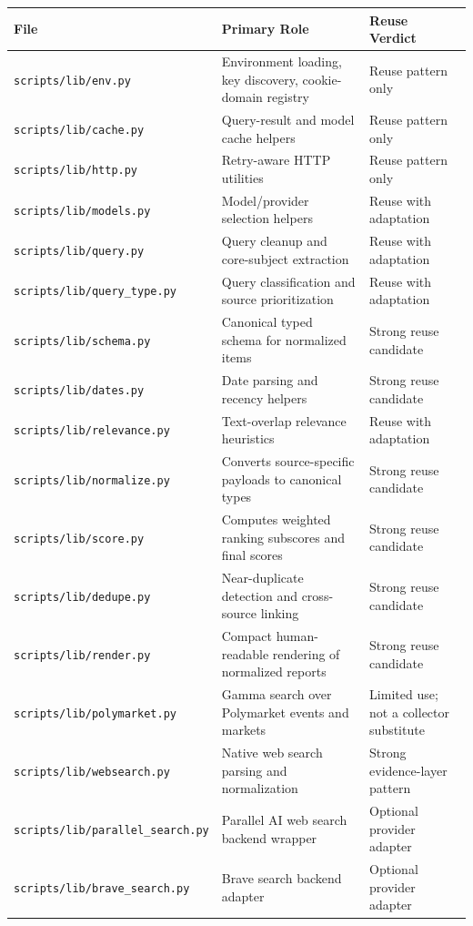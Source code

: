\documentclass[11pt, letterpaper]{article}
\begin{document}
\begin{longtable}{p{4.0cm}p{4.6cm}p{5.0cm}}
\toprule
\textbf{File} & \textbf{Primary Role} & \textbf{Reuse Verdict} \\
\midrule
\endhead
\texttt{scripts/lib/env.py} & Environment loading, key discovery, cookie-domain registry & Reuse pattern only \\
\texttt{scripts/lib/cache.py} & Query-result and model cache helpers & Reuse pattern only \\
\texttt{scripts/lib/http.py} & Retry-aware HTTP utilities & Reuse pattern only \\
\texttt{scripts/lib/models.py} & Model/provider selection helpers & Reuse with adaptation \\
\texttt{scripts/lib/query.py} & Query cleanup and core-subject extraction & Reuse with adaptation \\
\texttt{scripts/lib/query\_type.py} & Query classification and source prioritization & Reuse with adaptation \\
\texttt{scripts/lib/schema.py} & Canonical typed schema for normalized items & Strong reuse candidate \\
\texttt{scripts/lib/dates.py} & Date parsing and recency helpers & Strong reuse candidate \\
\texttt{scripts/lib/relevance.py} & Text-overlap relevance heuristics & Reuse with adaptation \\
\texttt{scripts/lib/normalize.py} & Converts source-specific payloads to canonical types & Strong reuse candidate \\
\texttt{scripts/lib/score.py} & Computes weighted ranking subscores and final scores & Strong reuse candidate \\
\texttt{scripts/lib/dedupe.py} & Near-duplicate detection and cross-source linking & Strong reuse candidate \\
\texttt{scripts/lib/render.py} & Compact human-readable rendering of normalized reports & Strong reuse candidate \\
\texttt{scripts/lib/polymarket.py} & Gamma search over Polymarket events and markets & Limited use; not a collector substitute \\
\texttt{scripts/lib/websearch.py} & Native web search parsing and normalization & Strong evidence-layer pattern \\
\texttt{scripts/lib/parallel\_search.py} & Parallel AI web search backend wrapper & Optional provider adapter \\
\texttt{scripts/lib/brave\_search.py} & Brave search backend adapter & Optional provider adapter \\

\end{longtable}
\end{document}
